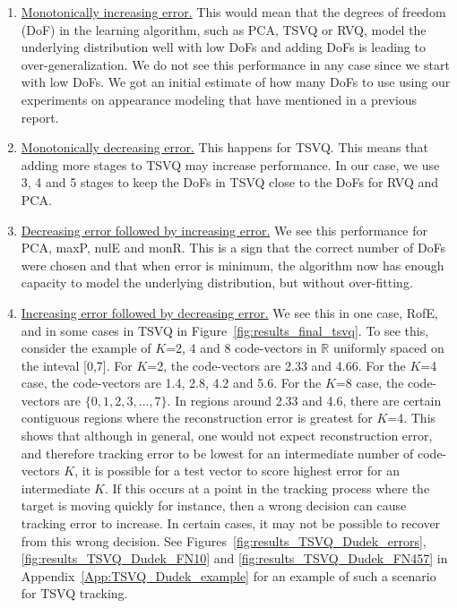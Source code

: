 \begin{enumerate}
\item \underline{Monotonically increasing error.}  This would mean that the degrees of freedom (DoF) in the learning algorithm, such as PCA, TSVQ or RVQ, model the underlying distribution well with low DoFs and adding DoFs is leading to over-generalization.  We do not see this performance in any case since we start with low DoFs.  We got an initial estimate of how many DoFs to use using our experiments on appearance modeling that have mentioned in a previous report.
\item \underline{Monotonically decreasing error.}  This happens for TSVQ.  This means that adding more stages to TSVQ may increase performance.  In our case, we use 3, 4 and 5 stages to keep the DoFs in TSVQ close to the DoFs for RVQ and PCA.
\item \underline{Decreasing error followed by increasing error.}  We see this performance for PCA, maxP, nulE and monR.  This is a sign that the correct number of DoFs were chosen and that when error is minimum, the algorithm now has enough capacity to model the underlying distribution, but without over-fitting.
\item \underline{Increasing error followed by decreasing error.}  We see this in one case, RofE, and in some cases in TSVQ in Figure~\ref{fig:results_final_tsvq}.  To see this, consider the example of $K$=2, 4 and 8 code-vectors in $\mathbb{R}$ uniformly spaced on the inteval [0,7].  For $K$=2, the code-vectors are 2.33 and 4.66.  For the $K$=4 case, the code-vectors are 1.4, 2.8, 4.2 and 5.6.  For the $K$=8 case, the code-vectors are $\{0, 1, 2, 3, \ldots, 7\}$.  In regions around 2.33 and 4.6, there are certain contiguous regions where the reconstruction error is greatest for $K$=4.  This shows that although in general, one would not expect reconstruction error, and therefore tracking error to be lowest for an intermediate number of code-vectors $K$, it is possible for a test vector to score highest error for an intermediate $K$.  If this occurs at a point in the tracking process where the target is moving quickly for instance, then a wrong decision can cause tracking error to increase.  In certain cases, it may not be possible to recover from this wrong decision.  See Figures~\ref{fig:results_TSVQ_Dudek_errors}, \ref{fig:results_TSVQ_Dudek_FN10} and \ref{fig:results_TSVQ_Dudek_FN457} in Appendix~\ref{App:TSVQ_Dudek_example} for an example of such a scenario for TSVQ tracking.


\end{enumerate}

